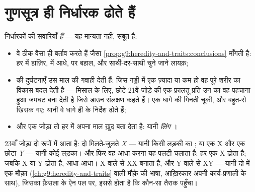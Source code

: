 \section{गुणसूत्र ही निर्धारक ढोते हैं}

\begin{proposition}\label{prop:g9:chromosomes:evidence}
 निर्धारकों की सवारियाँ \emph{हैं} --- यह मान्यता नहीं, सबूत
है:
\begin{itemize}
  \item वे ठीक वैसा ही बर्ताव करते हैं जैसा
        \cref{prop:g9:heredity-and-traits:conclusions} माँगती है:
        हर  में हाज़िर,  में आधे,  पर बहाल, और
        साथी-दर-साथी चुने जाने लायक़;
  \item {} की दुर्घटनाएँ उस माल की गवाही देती हैं: जिस
        गड्डी में एक  ज़्यादा या कम हो वह पूरे शरीर का विकास
        बदल देती है --- मिसाल के लिए, छोटे 21वें जोड़े की एक फ़ालतू
        प्रति उन  का वह पहचाना हुआ जमघट बना देती है जिसे डाउन
        संलक्षण कहते हैं। एक धागे की गिनती चूकी, और बहुत-से  खिसक
        गए: यानी वे धागे ही  के निर्देश ढोते हैं;
  \item और एक जोड़ा तो हर  में अपना माल ख़ुद बता देता है:
        यानी \emph{लिंग }।
\end{itemize}
\end{proposition}
\admitted

\begin{definition}[X, Y, और वह सिक्का]\label{def:g9:chromosomes:xy}
23वाँ जोड़ा दो रूपों में आता है: दो मिलते-जुलते \emph{X}  ---
यानी किसी लड़की का ; या एक X और एक छोटा \emph{Y} --- यानी
कोई लड़का। और फिर वह आधा करना यह पलटी चलाता है: हर  एक X ढोता है;
जबकि  X या Y ढोता है, आधा-आधा। X वाले  से  XX
बनाता है, और Y वाले से XY --- यानी दो में एक मौक़ा
(\cref{ch:g9:heredity-and-traits} वाली मौक़े की भाषा, आख़िरकार अपनी
कार्य-प्रणाली के साथ), जिसका फ़ैसला  के ऐन पल पर, इससे होता है कि
कौन-सा तैराक पहुँचा।
\end{definition}

